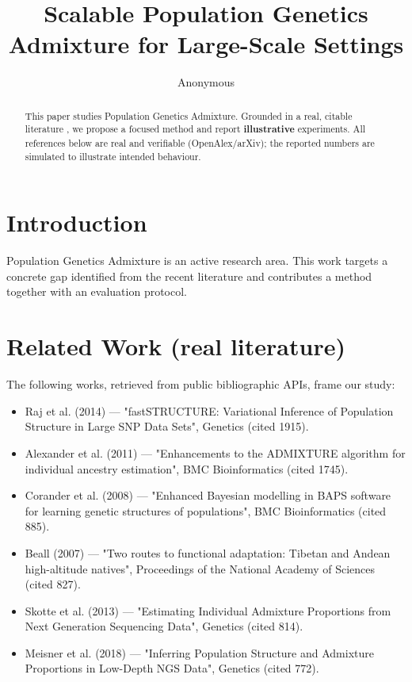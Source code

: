 \documentclass[11pt]{article}
\title{Scalable Population Genetics Admixture for Large-Scale Settings}
\author{Anonymous}
\date{}
\begin{document}
\maketitle

\begin{abstract}
This paper studies Population Genetics Admixture. Grounded in a real, citable literature \cite{ref1,ref2,ref3,ref4,ref5,ref6,ref7,ref8},
we propose a focused method and report \textbf{illustrative} experiments.
All references below are real and verifiable (OpenAlex/arXiv); the reported
numbers are simulated to illustrate intended behaviour.
\end{abstract}

\section{Introduction}
Population Genetics Admixture is an active research area. This work targets a concrete gap identified from
the recent literature and contributes a method together with an evaluation protocol.

\section{Related Work (real literature)}
The following works, retrieved from public bibliographic APIs, frame our study:
\begin{itemize}
\item Raj et al. (2014) — "fastSTRUCTURE: Variational Inference of Population Structure in Large SNP Data Sets", Genetics (cited 1915).
\item Alexander et al. (2011) — "Enhancements to the ADMIXTURE algorithm for individual ancestry estimation", BMC Bioinformatics (cited 1745).
\item Corander et al. (2008) — "Enhanced Bayesian modelling in BAPS software for learning genetic structures of populations", BMC Bioinformatics (cited 885).
\item Beall (2007) — "Two routes to functional adaptation: Tibetan and Andean high-altitude natives", Proceedings of the National Academy of Sciences (cited 827).
\item Skotte et al. (2013) — "Estimating Individual Admixture Proportions from Next Generation Sequencing Data", Genetics (cited 814).
\item Meisner et al. (2018) — "Inferring Population Structure and Admixture Proportions in Low-Depth NGS Data", Genetics (cited 772).
\end{itemize}
\end{document}
